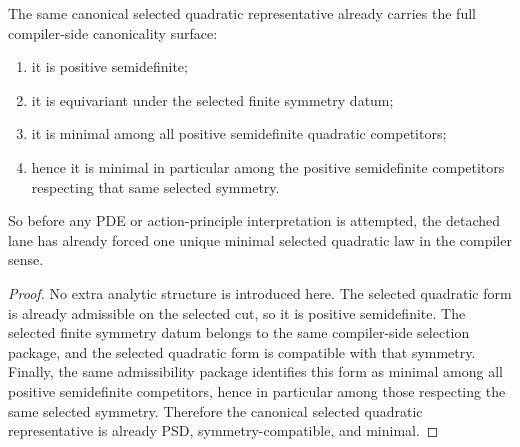 \begin{theorem}
\label{thm:the-canonical-quadratic-representative-is-already-psd-symmetry-compatible-and-minimal}
The same canonical selected quadratic representative already carries the full
compiler-side canonicality surface:
\begin{enumerate}
\item it is positive semidefinite;
\item it is equivariant under the selected finite symmetry datum;
\item it is minimal among all positive semidefinite quadratic competitors;
\item hence it is minimal in particular among the positive semidefinite
      competitors respecting that same selected symmetry.
\end{enumerate}
So before any PDE or action-principle interpretation is attempted, the
detached lane has already forced one unique minimal selected quadratic law in
the compiler sense.
\end{theorem}

\begin{proof}
No extra analytic structure is introduced here. The selected quadratic form is
already admissible on the selected cut, so it is positive semidefinite. The
selected finite symmetry datum belongs to the same compiler-side selection
package, and the selected quadratic form is compatible with that symmetry.
Finally, the same admissibility package identifies this form as minimal among
all positive semidefinite competitors, hence in particular among those
respecting the same selected symmetry. Therefore the canonical selected
quadratic representative is already PSD, symmetry-compatible, and minimal.
\end{proof}

